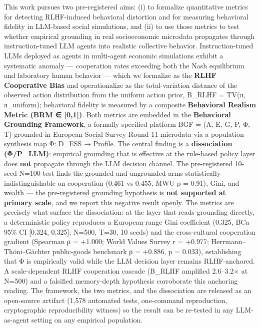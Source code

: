 
This work pursues two pre-registered aims: (i) to formalize quantitative metrics for detecting RLHF-induced behavioral distortion and for measuring behavioral fidelity in LLM-based social simulations, and (ii) to use those metrics to test whether empirical grounding in real socioeconomic microdata propagates through instruction-tuned LLM agents into realistic collective behavior. Instruction-tuned LLMs deployed as agents in multi-agent economic simulations exhibit a systematic anomaly --- cooperation rates exceeding both the Nash equilibrium and laboratory human behavior --- which we formalize as the \textbf{RLHF Cooperative Bias} and operationalize as the total-variation distance of the observed action distribution from the uniform action prior, B\_RLHF = TV(π, π\_uniform); behavioral fidelity is measured by a composite \textbf{Behavioral Realism Metric (BRM ∈ [0,1])}. Both metrics are embedded in the \textbf{Behavioral Grounding Framework}, a formally specified platform BGF = (A, E, G, P, Φ, T) grounded in European Social Survey Round 11 microdata via a population-synthesis map Φ: D\_ESS → Profile. The central finding is a \textbf{dissociation (Φ/P\_LLM)}: empirical grounding that is effective at the rule-based policy layer does \textbf{not} propagate through the LLM decision channel. The pre-registered 10-seed N=100 test finds the grounded and ungrounded arms statistically indistinguishable on cooperation (0.461 vs 0.455, MWU p = 0.91), Gini, and wealth --- the pre-registered grounding hypothesis is \textbf{not supported at primary scale}, and we report this negative result openly. The metrics are precisely what surface the dissociation: at the layer that reads grounding directly, a deterministic policy reproduces a European-range Gini coefficient (0.325, BCa 95\% CI [0.324, 0.325]; N=500, T=30, 10 seeds) and the cross-cultural cooperation gradient (Spearman ρ = +1.000; World Values Survey r = +0.977; Herrmann--Thöni--Gächter public-goods benchmark ρ = +0.886, p = 0.033), establishing that Φ is empirically valid while the LLM decision layer remains RLHF-anchored. A scale-dependent RLHF cooperation cascade (B\_RLHF amplified 2.6--3.2× at N=500) and a falsified memory-depth hypothesis corroborate this anchoring reading. The framework, the two metrics, and the dissociation are released as an open-source artifact (1{,}578 automated tests, one-command reproduction, cryptographic reproducibility witness) so the result can be re-tested in any LLM-as-agent setting on any empirical population.
